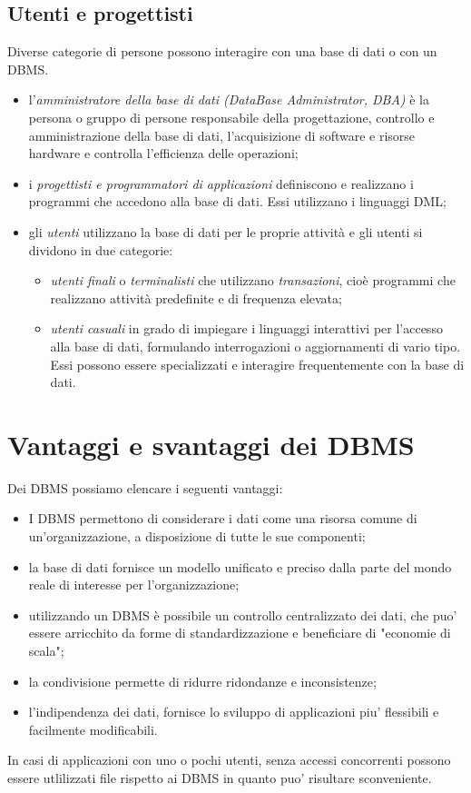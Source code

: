 \documentclass[12pt]{report}
\begin{document}
			\subsection{Utenti e progettisti}
			Diverse categorie di persone possono interagire con una base di dati o con un DBMS.
			\begin{itemize}
				\item l'\textit{amministratore della base di dati (DataBase Administrator, DBA)} è la persona o gruppo di persone responsabile della progettazione, controllo e amministrazione della base di dati, l'acquisizione di software e risorse hardware e controlla l'efficienza delle operazioni;
				\item i \textit{progettisti e programmatori di applicazioni} definiscono e realizzano i programmi che accedono alla base di dati. Essi utilizzano i linguaggi DML;
				\item gli \textit{utenti} utilizzano la base di dati per le proprie attività e gli utenti si dividono in due categorie:
				\begin{itemize}
					\item \textit{utenti finali} o \textit{terminalisti} che utilizzano \textit{transazioni}, cioè programmi che realizzano attività predefinite e di frequenza elevata;
					\item \textit{utenti casuali} in grado di impiegare i linguaggi interattivi per l'accesso alla base di dati, formulando interrogazioni o aggiornamenti di vario tipo. Essi possono essere specializzati e interagire frequentemente con la base di dati.
				\end{itemize}
			\end{itemize}
			\section{Vantaggi e svantaggi dei DBMS}
			Dei DBMS possiamo elencare i seguenti vantaggi:
			\begin{itemize}
				\item I DBMS permettono di considerare i dati come una risorsa comune di un'organizzazione, a disposizione di tutte le sue componenti;
				\item la base di dati fornisce un modello unificato e preciso dalla parte del mondo reale di interesse per l'organizzazione;
				\item utilizzando un DBMS è possibile un controllo centralizzato dei dati, che puo' essere arricchito da forme di standardizzazione e beneficiare di "economie di scala";
				\item la condivisione permette di ridurre ridondanze e inconsistenze;
				\item l'indipendenza dei dati, fornisce lo sviluppo di applicazioni piu' flessibili e facilmente modificabili.
			\end{itemize}
			In casi di applicazioni con uno o pochi utenti, senza accessi concorrenti possono essere utlilizzati file rispetto ai DBMS in quanto puo' risultare sconveniente.
\end{document}
